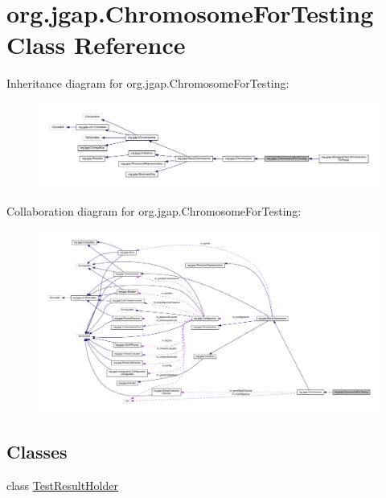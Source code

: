 \hypertarget{classorg_1_1jgap_1_1_chromosome_for_testing}{\section{org.\-jgap.\-Chromosome\-For\-Testing Class Reference}
\label{classorg_1_1jgap_1_1_chromosome_for_testing}
}


Inheritance diagram for org.\-jgap.\-Chromosome\-For\-Testing\-:
\nopagebreak
\begin{figure}[H]
\begin{center}
\leavevmode
\includegraphics[width=350pt]{classorg_1_1jgap_1_1_chromosome_for_testing__inherit__graph}
\end{center}
\end{figure}


Collaboration diagram for org.\-jgap.\-Chromosome\-For\-Testing\-:
\nopagebreak
\begin{figure}[H]
\begin{center}
\leavevmode
\includegraphics[width=350pt]{classorg_1_1jgap_1_1_chromosome_for_testing__coll__graph}
\end{center}
\end{figure}
\subsection*{Classes}
\begin{DoxyCompactItemize}
\item 
class \hyperlink{classorg_1_1jgap_1_1_chromosome_for_testing_1_1_test_result_holder}{Test\-Result\-Holder}
\end{DoxyCompactItemize}
